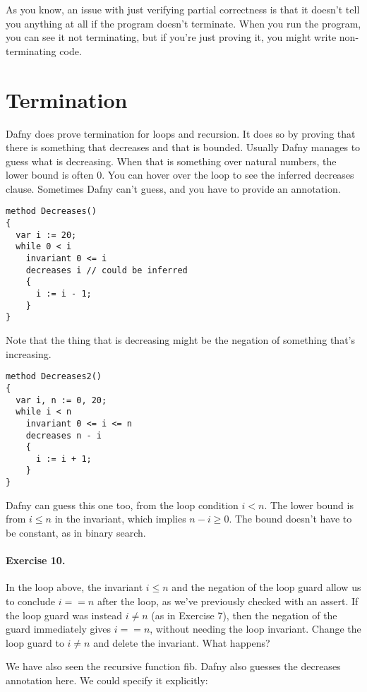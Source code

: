 \documentclass[11pt]{article}
\begin{document}
As you know, an issue with just verifying partial correctness is that it doesn't tell you
anything at all if the program doesn't terminate. When you run the program, you can see it not
terminating, but if you're just proving it, you might write non-terminating code.

\section*{Termination}
Dafny does prove termination for loops and recursion. It does so by proving that there is something
that decreases and that is bounded. Usually Dafny manages to guess what is decreasing. When that is
something over natural numbers, the lower bound is often 0. You can hover over
the loop to see the inferred decreases clause. Sometimes Dafny can't guess, and you have to provide an annotation.

\begin{lstlisting}[language=dafny]
method Decreases()
{
  var i := 20;
  while 0 < i
    invariant 0 <= i
    decreases i // could be inferred
    {
      i := i - 1;
    }
}
\end{lstlisting}
Note that the thing that is decreasing might be the negation of something that's increasing.
\begin{lstlisting}[language=dafny]
method Decreases2()
{
  var i, n := 0, 20;
  while i < n
    invariant 0 <= i <= n
    decreases n - i
    {
      i := i + 1;
    }
}
\end{lstlisting}
Dafny can guess this one too, from the loop condition $i < n$.
The lower bound is from $i \leq n$ in the invariant, which implies
$n - i \geq 0$. The bound doesn't have to be constant, as in binary search.

\paragraph{Exercise 10.} In the loop above, the invariant $i \leq n$
and the negation of the loop guard allow us to conclude $i == n$ after the loop,
as we've previously checked with an \textsf{assert}. If the loop guard was instead
$i \neq n$ (as in Exercise 7), then the negation of the guard immediately gives $i == n$,
without needing the loop invariant. Change the loop guard to $i \neq n$ and delete the invariant.
What happens?

We have also seen the recursive function \textsf{fib}. Dafny also guesses the decreases
annotation here. We could specify it explicitly:
\end{document}
